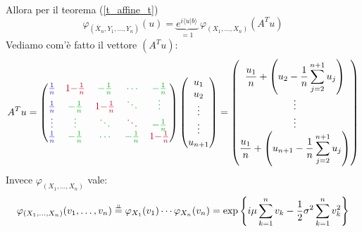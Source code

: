 \begin{enumerate}
$$$$
Allora per il teorema (\ref{t_affine_t})
$$
\varphi_{(\overline{X}_n,Y_1,\dots,Y_n)}(u)=\underbrace{e^{i\langle u|b\rangle}}_{=1} \ \varphi_{(X_1,\dots,X_n)}\left(A^T  u\right)
$$
Vediamo com'è fatto il vettore $\left(A^T  u\right)$:
$$
A^{T} u=\begin{pmatrix}
\textcolor[rgb]{0.15,0.11,0.85}{\frac{1}{n}} & \textcolor[rgb]{0.82,0.01,0.11}{1-}\textcolor[rgb]{0.82,0.01,0.11}{\frac{1}{n}} & \textcolor[rgb]{0.05,0.69,0.11}{-}\textcolor[rgb]{0.05,0.69,0.11}{\frac{1}{n}} & \textcolor[rgb]{0.05,0.69,0.11}{\cdots } & \textcolor[rgb]{0.05,0.69,0.11}{-}\textcolor[rgb]{0.05,0.69,0.11}{\frac{1}{n}}\\
\textcolor[rgb]{0.15,0.11,0.85}{\frac{1}{n}} & \textcolor[rgb]{0.05,0.69,0.11}{-}\textcolor[rgb]{0.05,0.69,0.11}{\frac{1}{n}} & \textcolor[rgb]{0.82,0.01,0.11}{1-}\textcolor[rgb]{0.82,0.01,0.11}{\frac{1}{n}} & \textcolor[rgb]{0.05,0.69,0.11}{\ddots } & \textcolor[rgb]{0.05,0.69,0.11}{\vdots }\\
\textcolor[rgb]{0.15,0.11,0.85}{\vdots } & \textcolor[rgb]{0.05,0.69,0.11}{\vdots } & \textcolor[rgb]{0.05,0.69,0.11}{\ddots } & \textcolor[rgb]{0.82,0.01,0.11}{\ddots } & \textcolor[rgb]{0.05,0.69,0.11}{-}\textcolor[rgb]{0.05,0.69,0.11}{\frac{1}{n}}\\
\textcolor[rgb]{0.15,0.11,0.85}{\frac{1}{n}} & \textcolor[rgb]{0.05,0.69,0.11}{-}\textcolor[rgb]{0.05,0.69,0.11}{\frac{1}{n}} & \textcolor[rgb]{0.05,0.69,0.11}{\cdots } & \textcolor[rgb]{0.05,0.69,0.11}{-}\textcolor[rgb]{0.05,0.69,0.11}{\frac{1}{n}} & \textcolor[rgb]{0.82,0.01,0.11}{1-}\textcolor[rgb]{0.82,0.01,0.11}{\frac{1}{n}}
\end{pmatrix}\begin{pmatrix}
u_{1}\\
u_{2}\\
\vdots \\
\vdots \\
u_{n+1}
\end{pmatrix} =\begin{pmatrix}
\dfrac{u_{1}}{n} +\left( u_{2} -\dfrac{1}{n}\displaystyle\sum _{j=2}^{n+1} u_{j}\right)\\
\vdots \\
\vdots \\
\dfrac{u_{1}}{n} +\left( u_{n+1} -\dfrac{1}{n}\displaystyle\sum _{j=2}^{n+1} u_{j}\right)
\end{pmatrix}
$$
Invece $\varphi_{(X_1,\dots,X_n)}$ vale:
$$
\varphi_{(X_1,\dots,X_n)}(v_1,\dots,v_n)\overset{\underset{\perp \!\!\! \perp}{}}{=}\varphi_{X_1}(v_1)\cdots\varphi_{X_n}(v_n)=\exp\left\{i\mu\sum_{k=1}^n v_k-\frac{1}{2}\sigma^2\sum_{k=1}^n v_k^2  \right\}
$$
\end{enumerate}
